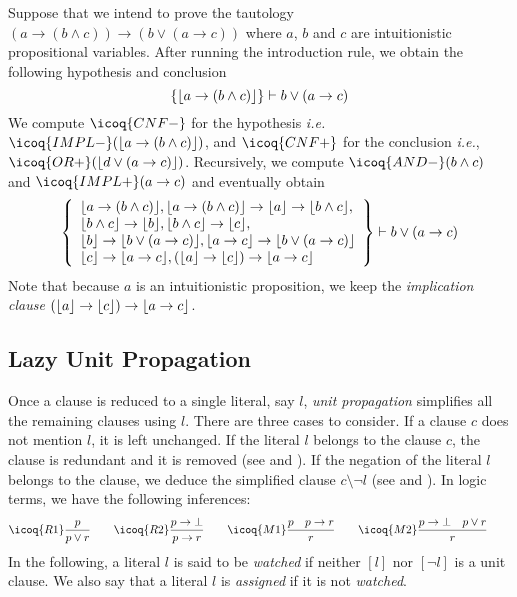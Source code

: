 \documentclass[utf8,a4paper,UKenglish,cleveref, autoref, thm-restate]{lipics-v2021}
\begin{document}
\begin{example}
  \label{exa:cnf}
  Suppose that we intend to prove the tautology
  $(a \to (b\land c)) \to (b \lor (a \to c))$ where $a$, $b$ and $c$ 
  are intuitionistic propositional variables.
  After running the introduction rule, we obtain the following hypothesis and conclusion
  \[
    \left\{\lfloor a \to (b\land c) \rfloor \right\}\vdash b \lor (a \to c)
  \]
  We compute $\icoq{CNF-}$ for the hypothesis \emph{i.e.} $\icoq{IMPL-}(\Lit{a \to (b\land c)})$, and $\icoq{CNF+}$ for the conclusion \emph{i.e.}, 
  $\icoq{OR+}(\Lit{d \lor (a \to c)})$.
  Recursively, we compute $\icoq{AND-}(b \land c)$ and $\icoq{IMPL+}(a \to c)$ and eventually obtain
  \[\left\{
    \begin{array}{l}
      \lfloor a \to (b \land c)  \rfloor, \lfloor a \to (b \land c) \rfloor \to \lfloor a \rfloor \to \lfloor b \land c \rfloor,\\
      \lfloor b \land c \rfloor \to \lfloor b \rfloor, \lfloor b \land c \rfloor \to \lfloor c \rfloor,\\
      \lfloor b \rfloor \to \lfloor b \lor (a \to c) \rfloor,
      \lfloor a \to c \rfloor \to \lfloor b \lor (a \to c) \rfloor\\
      \lfloor c \rfloor \to \lfloor a \to c \rfloor, (\lfloor a \rfloor \to \lfloor c \rfloor) \to \lfloor a \to c \rfloor
    \end{array}\right\}
    \vdash b \lor (a \to c)
  \]
  Note that because $a$ is an intuitionistic proposition,
  we keep the \emph{implication clause} $(\lfloor a \rfloor \to \lfloor c \rfloor) \to \lfloor a \to c \rfloor$.
\end{example}


\subsection{Lazy Unit Propagation}

Once a clause is reduced to a single literal, say $l$, \emph{unit
  propagation} simplifies all the remaining clauses using $l$. There
are three cases to consider.  If a clause $c$ does not mention $l$,
it is left unchanged. If the literal $l$ belongs to the clause $c$,
the clause is redundant and it is removed (see  and
). If the negation of the literal $l$ belongs to the clause,
we deduce the simplified clause $c \setminus \neg l$ (see  and ). In logic terms,
we have the following inferences:
\[
  \icoq{R1}\dfrac{ p }{ p \lor r } \qquad
  \icoq{R2}\dfrac {p \to \bot }{ p \to r } \qquad 
  \icoq{M1}\dfrac{p \quad p \to r}
  { r }  \qquad
  \icoq{M2}\dfrac{p \to \bot \quad p \lor r}{r} 
  \qquad
\]
In the following, a literal $l$ is said to be \emph{watched} if
neither $[l]$ nor $[\neg l]$ is a unit clause. We also say that a
literal $l$ is \emph{assigned} if it is not \emph{watched}.
\end{document}
